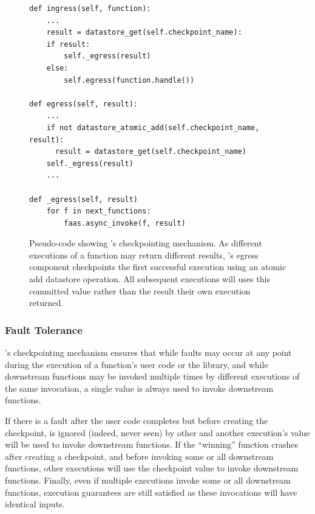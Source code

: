\begin{figure}
\begin{verbatim}
def ingress(self, function):
    ...
    result = datastore_get(self.checkpoint_name):
    if result:
        self._egress(result)
    else:
        self.egress(function.handle())

def egress(self, result):
    ...
    if not datastore_atomic_add(self.checkpoint_name, result):
      result = datastore_get(self.checkpoint_name)
    self._egress(result)
    ...

def _egress(self, result)
    for f in next_functions:
        faas.async_invoke(f, result)
\end{verbatim}
\caption{Pseudo-code showing \name{}'s checkpointing mechanism. As different
executions of a function may return different results, \name{}'s egress
component checkpoints the first successful execution using an atomic add
datastore operation. All subsequent executions will uses this committed value
rather than the result their own execution returned.}
\label{fig:design:checkpoint}
\end{figure}

\subsubsection{Fault Tolerance}


\name{}'s checkpointing mechanism ensures that while faults may occur at any
point during the execution of a function's user code or the \name{} library,
and while downstream functions may be invoked multiple times by different
executions of the same invocation, a single value is always used to invoke
downstream functions.

If there is a fault after the user code completes but before creating the
checkpoint,  is ignored (indeed, never seen) by
other  and another execution's value will be used to
invoke downstream functions.  If the ``winning'' function crashes after
creating a checkpoint, and before invoking some or all downstream functions,
other executions will use the checkpoint value to invoke downstream functions.
Finally, even if multiple executions invoke some or all downstream functions,
execution guarantees are still satisfied as these invocations will have
identical inputs.

